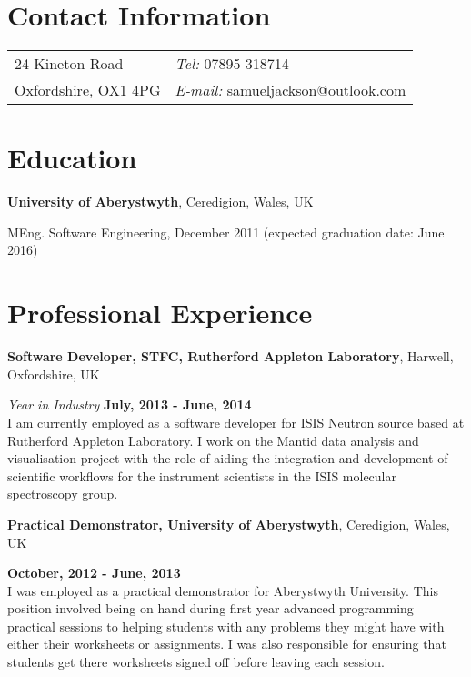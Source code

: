 \documentclass[margin,line]{res}
\newenvironment{list1}{
  \begin{list}{\ding{113}}{%
      \setlength{\itemsep}{0in}
      \setlength{\parsep}{0in} \setlength{\parskip}{0in}
      \setlength{\topsep}{0in} \setlength{\partopsep}{0in} 
      \setlength{\leftmargin}{0.17in}}}{\end{list}}
\begin{document}

\begin{resume}
\section{\sc Contact Information}
\vspace{.05in}
\begin{tabular}{@{}p{2in}p{4in}}
24 Kineton Road             & {\it Tel:}  07895 318714 \\                  
Oxfordshire, OX1 4PG & {\it E-mail:}  samueljackson@outlook.com\\       
\end{tabular}

\section{\sc Education}
{\bf University of Aberystwyth}, Ceredigion, Wales, UK\\
\vspace*{-.1in}
\begin{list1}
\item[] MEng. Software Engineering, December 2011 (expected
  graduation date: June 2016) \\

\end{list1}

\section{\sc Professional Experience}
{\bf Software Developer, STFC, Rutherford Appleton Laboratory}, Harwell, Oxfordshire, UK

\vspace{-.3cm}
{\em Year in Industry} \hfill {\bf July, 2013 - June, 2014}\\
I am currently employed as a software developer for ISIS Neutron source based at Rutherford Appleton Laboratory. 
I work on the Mantid data analysis and visualisation project with the role of aiding the integration and development of scientific workflows for the instrument scientists in the ISIS molecular spectroscopy group.

{\bf Practical Demonstrator, University of Aberystwyth}, Ceredigion, Wales, UK

\vspace{-.3cm}
\hfill {\bf  October, 2012 - June, 2013}\\
I was employed as a practical demonstrator for Aberystwyth University. This position involved being on hand during first year advanced programming practical sessions to helping students with any problems they might have with either their worksheets or assignments. I was also responsible for ensuring that students get there worksheets signed off before leaving each session. 


\end{resume}
\end{document}
